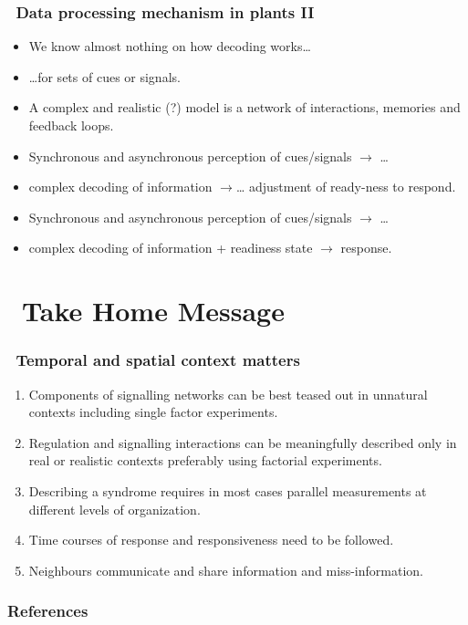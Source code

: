 \documentclass[11pt]{beamer}\usepackage[]{graphicx}\usepackage[]{xcolor}
\newcommand\ecomicons[1]{{\lineaecomfont\symbol{#1}}}
\newcommand\shopbagicon{\colorbox{white}{\textcolor{black}{\ecomicons{"0061}}}\xspace}
\newcommand\uleafmpics[1]{{\uleaffont\symbol{#1}}}
\newcommand\planticon{\colorbox{mygreen}{\textcolor{black}{\uleafmpics{"0031}}}\xspace}
\begin{document}
\begin{frame}
\frametitle{\planticon\ Data processing mechanism in plants II}
\begin{itemize}
  \item We know almost nothing on how decoding works\ldots
  \item[] \ldots for sets of cues or signals.
  \item A complex and realistic (?) model is a network of interactions, memories and feedback loops.
  \item Synchronous and asynchronous perception of cues/signals $\rightarrow$ \ldots
  \item[] complex decoding of information $\rightarrow$\ldots
    adjustment of ready-ness to respond.
  \item Synchronous and asynchronous perception of cues/signals $\rightarrow$ \ldots
  \item[] complex decoding of information + readiness state $\rightarrow$ response.
\end{itemize}
\end{frame}

\section{\shopbagicon\ Take Home Message}

\begin{frame}
  \frametitle{\shopbagicon\ Temporal and spatial context matters}
  \begin{enumerate}
    \item Components of signalling networks can be best teased out in unnatural contexts including single factor experiments.
    \item Regulation and signalling interactions can be meaningfully described only in real or realistic contexts preferably using factorial experiments.
    \item Describing a syndrome requires in most cases parallel measurements at different levels of organization.
    \item Time courses of response and responsiveness need to be followed.
    \item Neighbours communicate and share information and miss-information.
  \end{enumerate}
\end{frame}

\begin{frame}
  \frametitle{References}
  \nocite{Falik2022,Falik2023,Novoplansky2016a,Robson2014,Sadras2021,Sadras2021,Sadras2021,Aphalo1995}
{\renewcommand{\bibopenparen}{\adddot\addspace}
\renewcommand{\bibcloseparen}{\adddot\addspace}
}
\end{frame}
\end{document}
